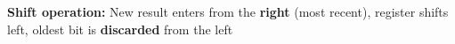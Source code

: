 \documentclass[aspectratio=169,12pt]{beamer}
\begin{document}
\begin{frame}
\begin{center}
  \end{center}

  \vspace{2em}
  \begin{tcolorbox}[colback=blue!10, colframe=blue!50]
    \small
    \textbf{Shift operation:} New result enters from the \textbf{right} (most recent), register shifts left, oldest bit is \textbf{discarded} from the left
  \end{tcolorbox}
\end{frame}

\end{document}
